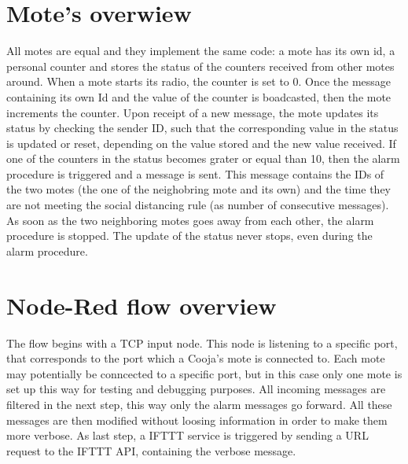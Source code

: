 \documentclass[11pt]{article}
\begin{document}
\section{Mote's overwiew}
All motes are equal and they implement the same code: \newline
a mote has its own id, a personal counter and stores the status of the counters received from other motes around. \newline
When a mote starts its radio, the counter is set to 0. Once the message containing its own Id and the value of the counter is boadcasted, then the mote increments the counter. \newline
Upon receipt of a new message, the mote updates its status by checking the sender ID, such that the corresponding value in the status is updated or reset, depending on the value stored and the new value received. \newline
If one of the counters in the status becomes grater or equal than 10, then the alarm procedure is triggered and a message is sent. This message contains the IDs of the two motes (the one of the neighobring mote and its own) and the time they are not meeting the social distancing rule (as number of consecutive messages). \newline
As soon as the two neighboring motes goes away from each other, the alarm procedure is stopped. The update of the status never stops, even during the alarm procedure.

\section{Node-Red flow overview}
The flow begins with a TCP input node. This node is listening to a specific port, that corresponds to the port which a Cooja's mote is connected to. Each mote may potentially be conncected to a specific port, but in this case only one mote is set up this way for testing and debugging purposes. \newline
All incoming messages are filtered in the next step, this way only the alarm messages go forward. All these messages are then modified without loosing information in order to make them more verbose. \newline
As last step, a IFTTT service is triggered by sending a URL request to the IFTTT API, containing the verbose message. \newline
\end{document}
